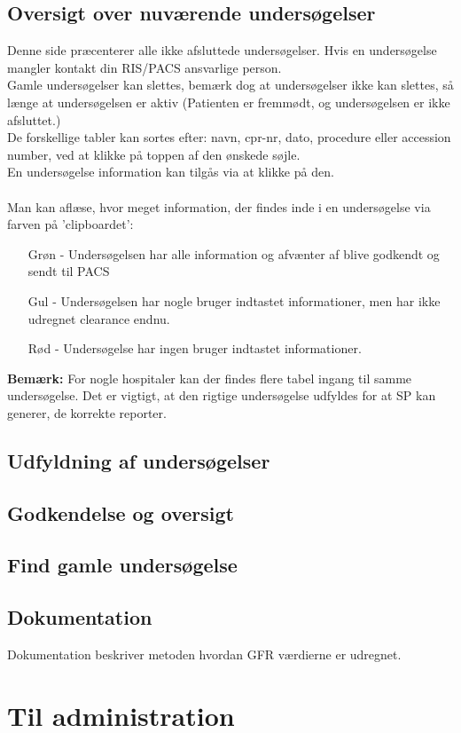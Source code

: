 \documentclass{article}
\begin{document}
\subsection{Oversigt over nuværende undersøgelser}
Denne side præcenterer alle ikke afsluttede undersøgelser. Hvis en undersøgelse mangler kontakt din RIS/PACS ansvarlige person.\\
Gamle undersøgelser kan slettes, bemærk dog at undersøgelser ikke kan slettes, så længe at undersøgelsen er aktiv (Patienten er fremmødt, og undersøgelsen er ikke afsluttet.)\\
De forskellige tabler kan sortes efter: navn, cpr-nr, dato, procedure eller accession number, ved at klikke på toppen af den ønskede søjle.\\
En undersøgelse information kan tilgås via at klikke på den.\\\\
Man kan aflæse, hvor meget information, der findes inde i en undersøgelse via farven på 'clipboardet':
\begin{itemize}
	\item[Grøn] - Undersøgelsen har alle information og afvænter af blive godkendt og sendt til PACS
	\item[Gul] - Undersøgelsen har nogle bruger indtastet informationer, men har ikke udregnet clearance endnu. 
	\item[Rød] - Undersøgelse har ingen bruger indtastet informationer. 
\end{itemize} 
\textbf{Bemærk:} For nogle hospitaler kan der findes flere tabel ingang til samme undersøgelse. Det er vigtigt, at den rigtige undersøgelse udfyldes for at  SP kan generer, de korrekte reporter.    
\subsection{Udfyldning af undersøgelser} 
\subsection{Godkendelse og oversigt}
\subsection{Find gamle undersøgelse}
\subsection{Dokumentation}
Dokumentation beskriver metoden hvordan GFR værdierne er udregnet. 
\newpage
\section{Til administration}
\end{document}
